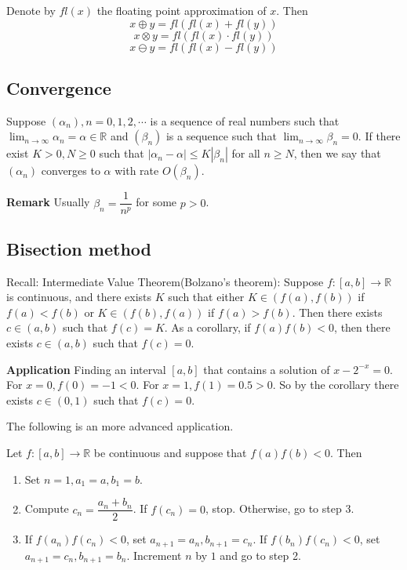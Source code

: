 \documentclass[main.tex]{subfiles}
\begin{document}
\begin{definition}
    Denote by $fl(x)$ the floating point approximation of $x$. Then 
\begin{equation}
    x \oplus y = fl(fl(x) + fl(y))
\end{equation}
\begin{equation}
    x \otimes y = fl(fl(x) \cdot fl(y))
\end{equation}
\begin{equation}
    x \ominus y = fl(fl(x) - fl(y)) 
\end{equation}
\end{definition}
\subsection{Convergence}
\begin{definition}
    Suppose $(\alpha_n), n = 0, 1, 2, \cdots $ is a sequence of real numbers such that $\lim_{n\to \infty} \alpha_n = \alpha\in \mathbb{R}$ and $(\beta_n)$ is a sequence such that $\lim_{n\to \infty} \beta_n = 0$. If there exist $K>0, N\ge 0$ such that $|\alpha_n - \alpha| \le K |\beta_n|$ for all $n \ge N$, then we say that $(\alpha_n)$ converges to $\alpha$ with rate $O(\beta_n)$. 
\end{definition}

\par \noindent \textbf{Remark} Usually $\beta_n = \dfrac{1}{n^p}$ for some $p>0$. 
\subsection{Bisection method}
\par Recall: Intermediate Value Theorem(Bolzano's theorem): Suppose $f:[a, b] \rightarrow \mathbb{R}$ is continuous, and there exists $K$ such that either $K\in (f(a), f(b))$ if $f(a) < f(b)$ or $K\in (f(b), f(a))$ if $f(a) > f(b)$. Then there exists $c\in (a, b)$ such that $f(c) = K$. As a corollary, if $f(a)f(b)<0$, then there exists $c\in (a, b)$ such that $f(c) = 0$. 
\par \noindent \textbf{Application} Finding an interval $[a, b]$ that contains a solution of $x - 2^{-x} = 0$. For $x = 0, f(0) = -1 < 0$. For $x = 1, f(1) = 0.5 > 0$. So by the corollary there exists $c\in (0, 1)$ such that $f(c) = 0$.
\par The following is an more advanced application. 
\begin{algorithm}
    Let $f:[a, b] \rightarrow \mathbb{R}$ be continuous and suppose that $f(a)f(b) < 0$. Then
    \begin{enumerate}
        \item Set $n = 1, a_1 = a, b_1 = b$.
        \item Compute $c_n = \dfrac{a_n + b_n}{2}$. If $f(c_n) = 0$, stop. Otherwise, go to step 3.
        \item If $f(a_n)f(c_n) < 0$, set $a_{n+1} = a_n, b_{n+1} = c_n$. If $f(b_n)f(c_n) < 0$, set $a_{n+1} = c_n, b_{n+1} = b_n$. Increment $n$ by $1$ and go to step 2.
    \end{enumerate}
\end{algorithm}
\end{document}
